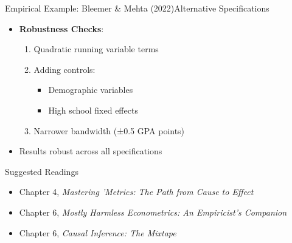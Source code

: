 \documentclass[hyperref={pdfpagelabels=false}]{beamer}
\begin{document}
\begin{frame}{Empirical Example: Bleemer \& Mehta (2022)}{Alternative Specifications}
	\begin{itemize}
	
		\item \textbf{Robustness Checks}:
		\begin{enumerate}
			\item Quadratic running variable terms
			\item Adding controls:
			\begin{itemize}
				\item Demographic variables
				\item High school fixed effects
			\end{itemize}
			\item Narrower bandwidth (±0.5 GPA points)
		\end{enumerate}
		
		\vspace{0.2cm}
		\item Results robust across all specifications
	\end{itemize}
\end{frame}


\begin{frame}{Suggested Readings} %
	\begin{itemize} 
		\item Chapter 4, \textit{Mastering 'Metrics: The Path from Cause to Effect}
		\vspace{0.2cm}
		\item Chapter 6, \textit{Mostly Harmless Econometrics: An Empiricist's Companion} %
		\vspace{0.2cm}
		\item Chapter 6, \textit{Causal Inference: The Mixtape}
	\end{itemize}
\end{frame}



	
	
	
\end{document}

